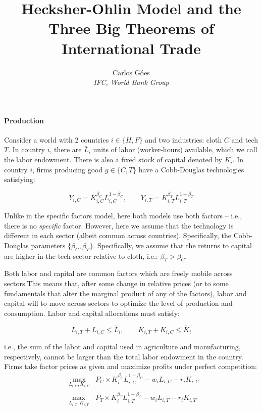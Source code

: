 \documentclass[11pt,letterpaper]{article}
\begin{document}
\title{\textbf{Hecksher-Ohlin Model and the Three Big Theorems of International Trade}}
\author{\large%
\setcounter{footnote}{0}%
Carlos G\'{o}es \\[-3pt] \textit{\small IFC, World Bank Group}
}
\maketitle

\paragraph{Production} Consider a world with 2 countries $i \in \{ H, F\}$ and two industries: cloth $C$ and tech $T$. In country $i$, there are $\bar{L}_i$ units of labor (worker-hours) available, which we call the labor endowment. There is also a fixed stock of capital denoted by $\bar{K}_i$. In country $i$, firms producing good $g \in \{ C, T\}$ have a Cobb-Douglas technologies satisfying:

\begin{equation*}
 Y_{i,C} = K_{i,C}^{\beta_C} L_{i,C}^{1-\beta_C}, \qquad  Y_{i,T} = K_{i,T}^{\beta_T} L_{i,T}^{1-\beta_T}
\end{equation*}

Unlike in the specific factors model, here both models use both factors -- i.e., there is no \textit{specific} factor. However, here we assume that the technology is different in each sector (albeit common across countries). Specifically, the Cobb-Douglas parameters $\{\beta_C,\beta_T\}$. Specifically, we assume that the returns to capital are higher in the tech sector relative to cloth, i.e.: $\beta_T > \beta_C$.

Both labor and capital are common factors which are freely mobile across sectors.This means that, after some change in relative prices (or to some fundamentals that alter the marginal product of any of the factors), labor and capital will to move across sectors to optimize the level of production and consumption. Labor and capital allocations must satisfy:

\begin{equation*}
    L_{i,T} + L_{i,C} \le \bar{L}_i, \qquad K_{i,T} + K_{i,C} \le \bar{K}_i
\end{equation*}

\noindent i.e., the sum of the labor and capital used in agriculture and manufacturing, respectively, cannot be larger than the total labor endowment in the country. Firms take factor prices as given and maximize profits under perfect competition:
        \begin{eqnarray*}\label{eq: production}
            &\max_{L_{i,C}, K_{i,C}}& P_{C} \times K_{i}^{\beta_C} L_{i,C}^{1-\beta_C} - w_i L_{i,C} - r_{i} K_{i,C} \\
            &\max_{L_{i,T}, K_{i,T}}& P_{T} \times K_{i}^{\beta_T} L_{i,T}^{1-\beta_T} - w_i L_{i,T} - r_{i} K_{i,T} 
        \end{eqnarray*}
\end{document}
